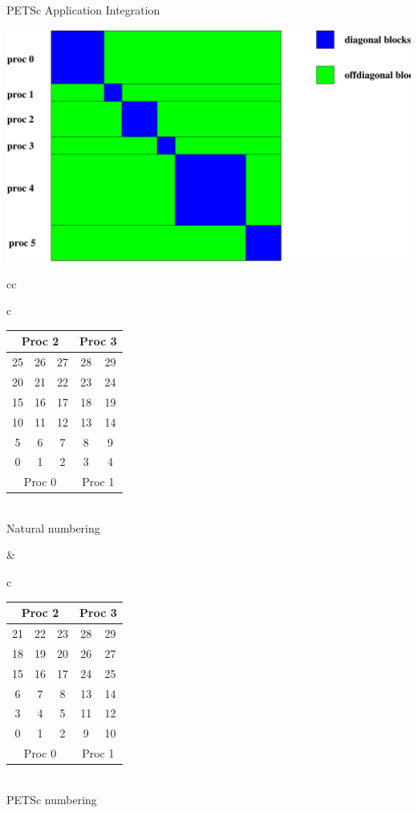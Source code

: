 \begin{frame}[fragile]{PETSc Application Integration}

\begin{center}
\includegraphics[width=3.in]{figures/Mat/parallelSparseMatrix}
\end{center}

\begin{center}
\begin{tabular}{cc}
\begin{tabular}{c}
\begin{tabular}{|ccc|cc|}
\hline
\multicolumn{3}{|c|}{Proc 2} & \multicolumn{2}{c|}{Proc 3} \\
\hline
25 & 26 & 27 & 28 & 29 \\
20 & 21 & 22 & 23 & 24 \\
15 & 16 & 17 & 18 & 19 \\
\hline
10 & 11 & 12 & 13 & 14 \\
 5 &  6 &  7 &  8 &  9 \\
 0 &  1 &  2 &  3 &  4 \\
\hline
\multicolumn{3}{|c|}{Proc 0} & \multicolumn{2}{c|}{Proc 1} \\
\hline
\end{tabular} \\
Natural numbering
\end{tabular}
& 
\begin{tabular}{c}
\begin{tabular}{|ccc|cc|}
\hline
\multicolumn{3}{|c|}{Proc 2} & \multicolumn{2}{c|}{Proc 3} \\
\hline
21 & 22 & 23 & 28 & 29 \\
18 & 19 & 20 & 26 & 27 \\
15 & 16 & 17 & 24 & 25 \\
\hline
 6 &  7 &  8 & 13 & 14 \\
 3 &  4 &  5 & 11 & 12 \\
 0 &  1 &  2 &  9 & 10 \\
\hline
\multicolumn{3}{|c|}{Proc 0} & \multicolumn{2}{c|}{Proc 1} \\
\hline
\end{tabular}\\
PETSc numbering
\end{tabular}
\end{tabular}
\end{center}

\end{frame}








